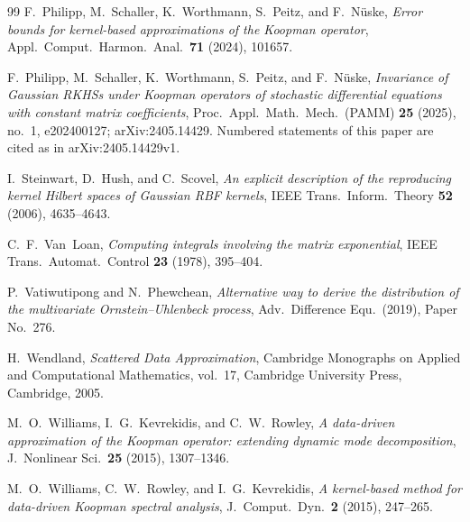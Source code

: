 \documentclass[11pt]{amsart}
\numberwithin{equation}{section}
\theoremstyle{definition}
\theoremstyle{remark}
\begin{document}
\begin{thebibliography}{99}
F.~Philipp, M.~Schaller, K.~Worthmann, S.~Peitz, and F.~N\"uske, \emph{Error bounds for kernel-based approximations of
the Koopman operator}, Appl.\ Comput.\ Harmon.\ Anal.\ \textbf{71} (2024), 101657.

F.~Philipp, M.~Schaller, K.~Worthmann, S.~Peitz, and F.~N\"uske, \emph{Invariance of Gaussian RKHSs under Koopman
operators of stochastic differential equations with constant matrix coefficients}, Proc.\ Appl.\ Math.\ Mech.\
(PAMM) \textbf{25} (2025), no.~1, e202400127; arXiv:2405.14429. Numbered statements of this paper are cited as in
arXiv:2405.14429v1.

I.~Steinwart, D.~Hush, and C.~Scovel, \emph{An explicit description of the reproducing kernel Hilbert spaces of
Gaussian RBF kernels}, IEEE Trans.\ Inform.\ Theory \textbf{52} (2006), 4635--4643.

C.~F.~Van~Loan, \emph{Computing integrals involving the matrix exponential}, IEEE Trans.\ Automat.\ Control
\textbf{23} (1978), 395--404.

P.~Vatiwutipong and N.~Phewchean, \emph{Alternative way to derive the distribution of the multivariate
Ornstein--Uhlenbeck process}, Adv.\ Difference Equ.\ (2019), Paper No.~276.

H.~Wendland, \emph{Scattered Data Approximation}, Cambridge Monographs on Applied and Computational Mathematics,
vol.~17, Cambridge University Press, Cambridge, 2005.

M.~O.~Williams, I.~G.~Kevrekidis, and C.~W.~Rowley, \emph{A data-driven approximation of the Koopman operator:
extending dynamic mode decomposition}, J.\ Nonlinear Sci.\ \textbf{25} (2015), 1307--1346.

M.~O.~Williams, C.~W.~Rowley, and I.~G.~Kevrekidis, \emph{A kernel-based method for data-driven Koopman spectral
analysis}, J.\ Comput.\ Dyn.\ \textbf{2} (2015), 247--265.

\end{thebibliography}
\end{document}
